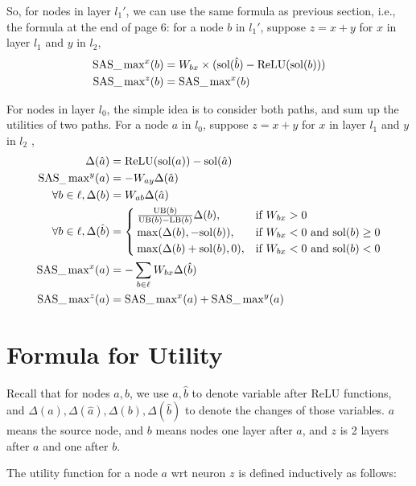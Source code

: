 So, for nodes in layer $l_1'$, we can use the same formula as previous section, i.e., the formula at the end of page 6: for a node $b$ in $l_1'$, suppose $z=x+y$ for $x$ in layer $l_1$ and $y$ in $l_2$, 
\begin{align*}
\mathrm{SAS}\_\max\nolimits^x(b) &= W_{bx} \times (\mathrm{sol}(\hat{b})- \mathrm{ReLU}(\mathrm{sol}(b)))\\
\mathrm{SAS}\_\max\nolimits^z(b) &= \mathrm{SAS}\_\max\nolimits^x(b)
\end{align*}

For nodes in layer $l_0$, the simple idea is to consider both paths, and sum up the utilities of two paths. For a node $a$ in $l_0$, suppose $z=x+y$ for $x$ in layer $l_1$ and $y$ in $l_2$ ,
\begin{align*}
		\Delta(\hat{a}) &= \mathrm{ReLU}(\mathrm{sol}(a))-\mathrm{sol}(\hat{a})\\
		\mathrm{SAS}_\_\max\nolimits^y(a) &= -W_{ay} \Delta(\hat{a})\\
	\forall b \in \ell, \Delta(b) &= W_{ab}\Delta(\hat{a})\\
	\forall b \in \ell, \Delta(\hat{b}) &=
	\begin{cases}
		\frac{\mathrm{UB}(b)}{\mathrm{UB}(b)-\mathrm{LB}(b)}\Delta(b),  &\text{if }W_{bx} > 0\\
		\max(\Delta(b),-\mathrm{sol}(b)),  &\text{if }  W_{bx} < 0 \text{ and } \mathrm{sol}(b)\geq0\\
		\max(\Delta(b)+\mathrm{sol}(b),0),  &\text{if }  W_{bx} < 0 \text{ and } \mathrm{sol}(b)<0		 
	\end{cases}\\
	\mathrm{SAS}\_\max\nolimits^x(a) &= -\sum_{b \in \ell} W_{bx} \Delta(\hat{b})\\
	\mathrm{SAS}\_\max\nolimits^z(a) &= \mathrm{SAS}\_\max\nolimits^x(a)+\mathrm{SAS}\_\max\nolimits^y(a)
\end{align*}

	
	
		
	


\section{Formula for Utility}


Recall that for nodes $a,b$, we use 
$\hat{a}, \hat{b}$ to denote variable after ReLU functions, and
$\Delta(a),\Delta(\hat{a}),\Delta(b),\Delta(\hat{b})$ to denote the changes of those variables. $a$ means the source node, and $b$ means nodes one layer after $a$, and $z$ is 2 layers after $a$ and one after $b$.

The utility function for a node $a$ wrt neuron $z$ is defined inductively as follows:


